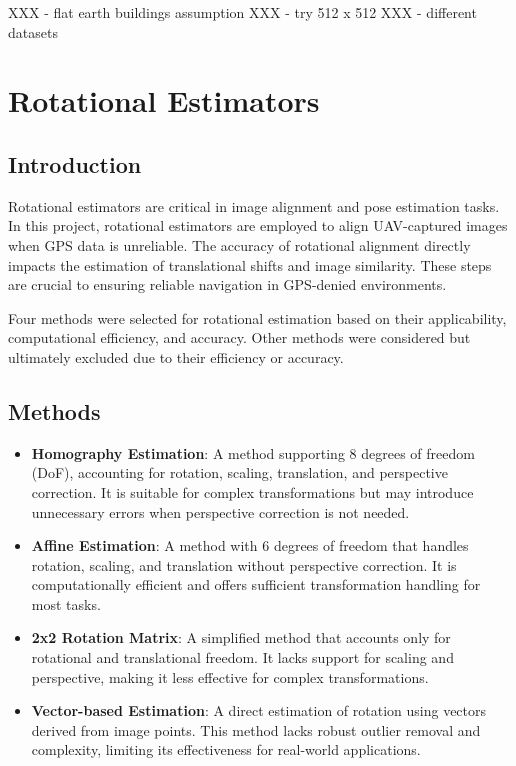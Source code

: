 

XXX - flat earth buildings assumption
XXX - try 512 x 512
XXX - different datasets


\section{Rotational Estimators}

\subsection{Introduction}
Rotational estimators are critical in image alignment and pose estimation tasks. In this project, rotational estimators are employed to align UAV-captured images when GPS data is unreliable. The accuracy of rotational alignment directly impacts the estimation of translational shifts and image similarity. These steps are crucial to ensuring reliable navigation in GPS-denied environments.

Four methods were selected for rotational estimation based on their applicability, computational efficiency, and accuracy. Other methods were considered but ultimately excluded due to their efficiency or accuracy.   

\subsection{Methods}
\begin{itemize}
    \item \textbf{Homography Estimation}: A method supporting 8 degrees of freedom (DoF), accounting for rotation, scaling, translation, and perspective correction. It is suitable for complex transformations but may introduce unnecessary errors when perspective correction is not needed.
    \item \textbf{Affine Estimation}: A method with 6 degrees of freedom that handles rotation, scaling, and translation without perspective correction. It is computationally efficient and offers sufficient transformation handling for most tasks.
    \item \textbf{2x2 Rotation Matrix}: A simplified method that accounts only for rotational and translational freedom. It lacks support for scaling and perspective, making it less effective for complex transformations.
    \item \textbf{Vector-based Estimation}: A direct estimation of rotation using vectors derived from image points. This method lacks robust outlier removal and complexity, limiting its effectiveness for real-world applications.
\end{itemize}

